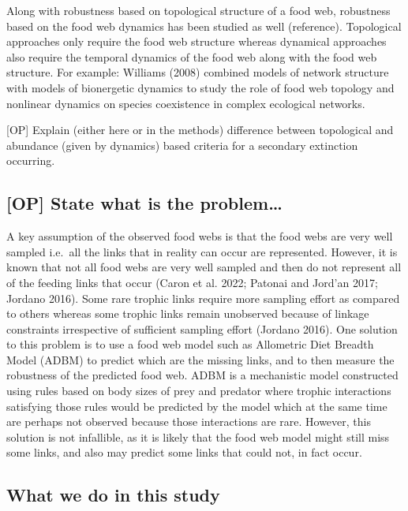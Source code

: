 \documentclass{article}
\begin{document}
Along with robustness based on topological structure of a food web,
robustness based on the food web dynamics has been studied as well
(reference). Topological approaches only require the food web structure
whereas dynamical approaches also require the temporal dynamics of the
food web along with the food web structure. For example: Williams (2008)
combined models of network structure with models of bionergetic dynamics
to study the role of food web topology and nonlinear dynamics on species
coexistence in complex ecological networks.

{[}OP{]} Explain (either here or in the methods) difference between
topological and abundance (given by dynamics) based criteria for a
secondary extinction occurring.

\hypertarget{op-state-what-is-the-problem}{%
\subsection{{[}OP{]} State what is the
problem\ldots{}}\label{op-state-what-is-the-problem}}

A key assumption of the observed food webs is that the food webs are
very well sampled i.e.~all the links that in reality can occur are
represented. However, it is known that not all food webs are very well
sampled and then do not represent all of the feeding links that occur
(Caron et al. 2022; Patonai and Jord'an 2017; Jordano 2016). Some rare
trophic links require more sampling effort as compared to others whereas
some trophic links remain unobserved because of linkage constraints
irrespective of sufficient sampling effort (Jordano 2016). One solution
to this problem is to use a food web model such as Allometric Diet
Breadth Model (ADBM) to predict which are the missing links, and to then
measure the robustness of the predicted food web. ADBM is a mechanistic
model constructed using rules based on body sizes of prey and predator
where trophic interactions satisfying those rules would be predicted by
the model which at the same time are perhaps not observed because those
interactions are rare. However, this solution is not infallible, as it
is likely that the food web model might still miss some links, and also
may predict some links that could not, in fact occur.

\hypertarget{what-we-do-in-this-study}{%
\subsection{What we do in this study}\label{what-we-do-in-this-study}}
\end{document}
